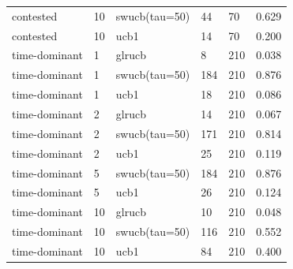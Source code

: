 \begin{tabular}{llllll}
contested & 10 & swucb(tau=50) & 44 & 70 & 0.629 \\
contested & 10 & ucb1 & 14 & 70 & 0.200 \\
time-dominant & 1 & glrucb & 8 & 210 & 0.038 \\
time-dominant & 1 & swucb(tau=50) & 184 & 210 & 0.876 \\
time-dominant & 1 & ucb1 & 18 & 210 & 0.086 \\
time-dominant & 2 & glrucb & 14 & 210 & 0.067 \\
time-dominant & 2 & swucb(tau=50) & 171 & 210 & 0.814 \\
time-dominant & 2 & ucb1 & 25 & 210 & 0.119 \\
time-dominant & 5 & swucb(tau=50) & 184 & 210 & 0.876 \\
time-dominant & 5 & ucb1 & 26 & 210 & 0.124 \\
time-dominant & 10 & glrucb & 10 & 210 & 0.048 \\
time-dominant & 10 & swucb(tau=50) & 116 & 210 & 0.552 \\
time-dominant & 10 & ucb1 & 84 & 210 & 0.400 \\
\bottomrule
\end{tabular}

